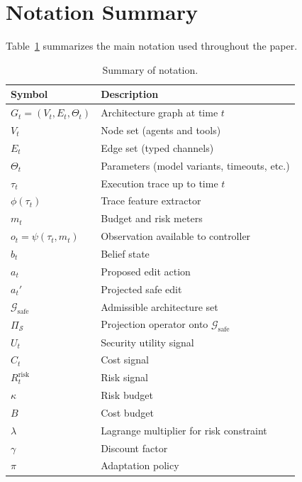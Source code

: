 \documentclass[sigconf,anonymous]{acmart}
\newcommand{\tabref}[1]{Table~\ref{#1}}
\begin{document}



\appendix

\section{Notation Summary}
\label{app:notation}

\tabref{tab:notation} summarizes the main notation used throughout the paper.

\begin{table}[h]
\centering
\caption{Summary of notation.}
\label{tab:notation}
\small
\begin{tabular}{ll}
\toprule
Symbol & Description \\
\midrule
$G_t = (V_t, E_t, \Theta_t)$ & Architecture graph at time $t$ \\
$V_t$ & Node set (agents and tools) \\
$E_t$ & Edge set (typed channels) \\
$\Theta_t$ & Parameters (model variants, timeouts, etc.) \\
$\tau_t$ & Execution trace up to time $t$ \\
$\phi(\tau_t)$ & Trace feature extractor \\
$m_t$ & Budget and risk meters \\
$o_t = \psi(\tau_t, m_t)$ & Observation available to controller \\
$b_t$ & Belief state \\
$a_t$ & Proposed edit action \\
$a_t'$ & Projected safe edit \\
$\mathcal{G}_{\text{safe}}$ & Admissible architecture set \\
$\Pi_{\mathcal{S}}$ & Projection operator onto $\mathcal{G}_{\text{safe}}$ \\
$U_t$ & Security utility signal \\
$C_t$ & Cost signal \\
$R_t^{\text{risk}}$ & Risk signal \\
$\kappa$ & Risk budget \\
$B$ & Cost budget \\
$\lambda$ & Lagrange multiplier for risk constraint \\
$\gamma$ & Discount factor \\
$\pi$ & Adaptation policy \\
\bottomrule
\end{tabular}
\end{table}
\end{document}
